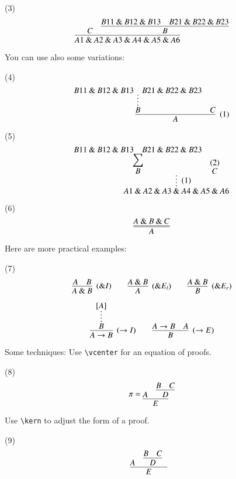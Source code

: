 \documentclass{article}
\def\imp{\to}
\def\land{\mathbin\&}
\begin{document}
\noindent (3)
$$
\infer{A1\land A2\land A3\land A4\land A5\land A6}{
	C
	&
	\infer{B}{
		B11\land B12\land B13
		&
		B21\land B22\land B23
	}
}
$$

You can use also some variations:

\noindent (4)
$$
\infer[(1)]{A}{
	\infer*{B}{
		B11\land B12\land B13
		&
		B21\land B22\land B23
	}
	&
	C
}
$$

\noindent (5)
$$
\infer*[(1)]{A1\land A2\land A3\land A4\land A5\land A6}{
	\deduce[{\displaystyle \sum}]{B}{
		B11\land B12\land B13
		&
		B21\land B22\land B23
	}
	&
	\deduce{C}{(2)}
}
$$

\noindent (6)
$$
\infer={A}{A \land B \land C}
$$

Here are more practical examples:

\noindent (7)
$$
\infer[(\land I)]{A \land B}{A & B}
\qquad
\infer[(\land E_l)]A{A\land B}
\qquad
\infer[(\land E_r)]B{A\land B}
$$

$$
\infer[(\imp I)]{A \imp B}{
	\infer*{B}{[A]}
}
\qquad
\infer[(\imp E)]{B}{
	A \imp B
	&
	A
}
$$

Some techniques:
Use \verb|\vcenter| for an equation of proofs.

\noindent (8)
$$
\pi = \vcenter{
	\infer{E}{
		A
		&
		\infer{D}{B & C}
	}
}
$$

Use \verb|\kern| to adjust the form of a proof.

\noindent (9)
$$
\infer{E}{
	A
	&
	\infer{D}{B & C} \kern 0.5cm
}
$$
\end{document}
